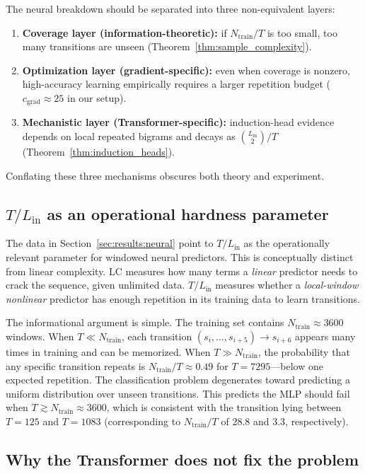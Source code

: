 \documentclass[11pt]{article}
\theoremstyle{plain}
\theoremstyle{definition}
\newcommand{\LC}{\mathrm{LC}}
\begin{document}
The neural breakdown should be separated into three non-equivalent layers:
\begin{enumerate}[leftmargin=2em]
\item \textbf{Coverage layer (information-theoretic):} if $N_{\mathrm{train}}/T$ is too small, too many transitions are unseen (Theorem~\ref{thm:sample_complexity}).
\item \textbf{Optimization layer (gradient-specific):} even when coverage is nonzero, high-accuracy learning empirically requires a larger repetition budget ($c_{\mathrm{grad}}\approx 25$ in our setup).
\item \textbf{Mechanistic layer (Transformer-specific):} induction-head evidence depends on local repeated bigrams and decays as $\binom{L_{\mathrm{in}}}{2}/T$ (Theorem~\ref{thm:induction_heads}).
\end{enumerate}
Conflating these three mechanisms obscures both theory and experiment.

\subsection{$T/L_{\mathrm{in}}$ as an operational hardness parameter}

The data in Section~\ref{sec:results:neural} point to $T/L_{\mathrm{in}}$ as the operationally relevant parameter for windowed neural predictors. This is conceptually distinct from linear complexity. $\LC$ measures how many terms a \emph{linear} predictor needs to crack the sequence, given unlimited data. $T/L_{\mathrm{in}}$ measures whether a \emph{local-window nonlinear} predictor has enough repetition in its training data to learn transitions.

The informational argument is simple. The training set contains $N_{\mathrm{train}} \approx 3600$ windows. When $T \ll N_{\mathrm{train}}$, each transition $(s_i,\ldots,s_{i+5}) \to s_{i+6}$ appears many times in training and can be memorized. When $T \gg N_{\mathrm{train}}$, the probability that any specific transition repeats is $N_{\mathrm{train}}/T \approx 0.49$ for $T=7295$---below one expected repetition. The classification problem degenerates toward predicting a uniform distribution over unseen transitions. This predicts the MLP should fail when $T \gtrsim N_{\mathrm{train}} \approx 3600$, which is consistent with the transition lying between $T=125$ and $T=1083$ (corresponding to $N_{\mathrm{train}}/T$ of 28.8 and 3.3, respectively).

\subsection{Why the Transformer does not fix the problem}
\end{document}
